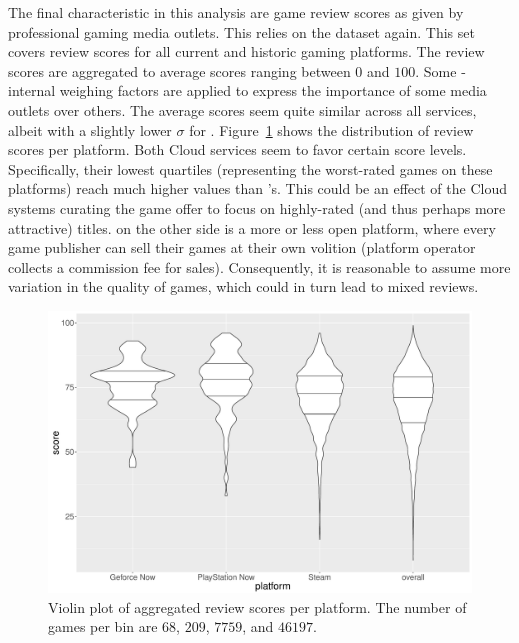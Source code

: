 The final characteristic in this analysis are game review scores as
given by professional gaming media outlets. This relies on the
\metacritic dataset again. This set covers review scores for all current
and historic gaming platforms. The review scores are aggregated to
average scores ranging between $0$ and $100$. Some \metacritic-internal
weighing factors are applied to express the importance of some media
outlets over others.
The average scores seem quite similar across all services, albeit with a
slightly lower $\sigma$ for \gfnow. Figure~\ref{fig:scores-by-platform}
shows the distribution of review scores per platform. Both Cloud
services seem to favor certain score levels. Specifically, their lowest
quartiles (representing the worst-rated games on these platforms) reach
much higher values than \steam's. This could be an effect of the Cloud
systems curating the game offer to focus on highly-rated (and thus
perhaps more attractive) titles. \steam on the other side is a more or
less open platform, where every game publisher can sell their games at
their own volition (platform operator collects a commission fee for
sales). Consequently, it is reasonable to assume more variation in the
quality of games, which could in turn lead to mixed reviews.



\begin{figure}[!t]
	\centering
	\includegraphics[width=1.0\columnwidth]{images/scores-by-platform-violin.pdf}
	\caption{Violin plot of aggregated review scores per platform. The number of games per bin are $68$, $209$, $7759$, and $46197$.}
\label{fig:scores-by-platform}
\end{figure}

